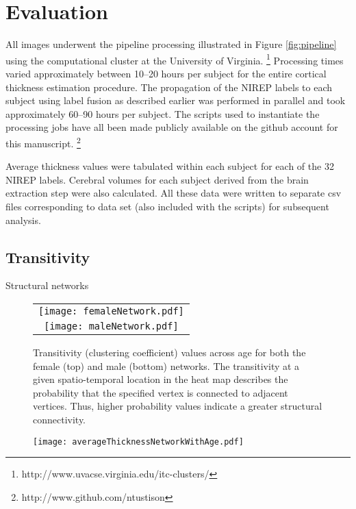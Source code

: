 \section{Evaluation}

All images underwent the pipeline processing illustrated in Figure 
\ref{fig:pipeline} using the computational cluster at the University 
of Virginia.%
\footnote{
http://www.uvacse.virginia.edu/itc-clusters/
}  
Processing times varied approximately between 10--20 hours per subject
for the entire cortical thickness estimation procedure.  The propagation of the
NIREP labels to each subject using label fusion as described earlier
was performed in parallel and took approximately 60--90 hours per 
subject.  The scripts used to instantiate the processing jobs have all been made 
publicly available on the github account for this manuscript.%
\footnote{
http://www.github.com/ntustison
}

Average thickness values were tabulated within each subject for each of the
32 NIREP labels.  Cerebral volumes for each subject derived from the brain 
extraction step were also calculated.  All these data were written to separate csv
files corresponding to data set (also included with the scripts) for subsequent 
analysis.

\subsection{Transitivity}
Structural networks \cite{he2007,chen2008}


\begin{figure*}
  \centering
  \begin{tabular}{c}
  \texttt{[image: femaleNetwork.pdf]} \\
  \texttt{[image: maleNetwork.pdf]}
  \end{tabular}
  \caption{Transitivity (clustering coefficient) values across age for both the female (top)
  and male (bottom) networks.  The transitivity at a given spatio-temporal
  location in the heat map describes the probability that the specified 
  vertex is connected to adjacent vertices.  Thus, higher probability values indicate a
  greater structural connectivity.
  }
  \label{fig:network}
\end{figure*}

\begin{figure}
  \centering
  \texttt{[image: averageThicknessNetworkWithAge.pdf]}
  \caption{ 
  }
  \label{fig:corr_vs_age}
\end{figure}




